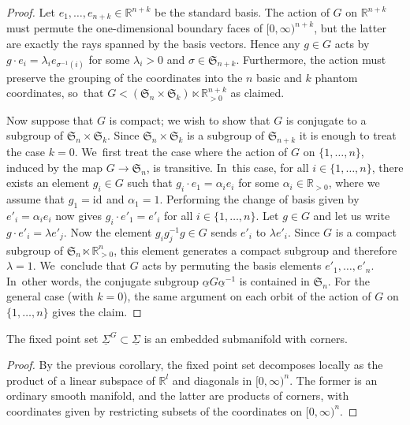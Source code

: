 \documentclass[10pt]{amsart}
\theoremstyle{definition}
\theoremstyle{remark}
\newcommand{\RR}{\mathbb{R}}
\newcommand{\halfspc}[1]{[0,\infty)^{#1}}
\newcommand{\id}[1]{\mathrm{id}_{#1}}
\newcommand{\uSig}{\underline{\Sigma}}
\newcommand{\symgp}[1]{\mathfrak{S}_{#1}}
\begin{document}
\begin{proof}
Let $e_1,\ldots,e_{n+k} \in \RR^{n+k}$ be the standard basis.
The action of $G$ on $\RR^{n+k}$ must permute the one-dimensional boundary faces of $\halfspc{n+k}$, but the latter are exactly the rays spanned by the basis vectors. Hence any $g \in G$ acts by $g \cdot e_i = \lambda_i e_{\sigma^{-1}(i)}$ for some $\lambda_i > 0$ and $\sigma \in \symgp{n+k}$.
Furthermore, the action must preserve the grouping of the coordinates into the $n$ basic and $k$ phantom coordinates, so~that $G < (\symgp{n}\times\symgp{k})\ltimes \RR_{>0}^{n+k}$ as claimed.

Now suppose that $G$ is compact; we wish to show that $G$ is conjugate to a subgroup of $\symgp{n}\times\symgp{k}$. Since $\symgp{n}\times\symgp{k}$ is a subgroup of $\symgp{n+k}$ it is enough to treat the case $k=0$. We~first treat the case where the action of $G$ on $\{1,\ldots,n\}$, induced by the map $G\to \symgp{n}$, is transitive. In~this case, for all $i\in\{1,\ldots,n\}$, there exists an element $g_i\in G$ such that $g_i \cdot e_1=\alpha_ie_i$ for some $\alpha_i\in \RR_{>0}$, where we assume that $g_1=\id{}$ and $\alpha_1=1$. Performing the change of basis given by $e'_i=\alpha_i e_i$ now gives $g_i\cdot e'_1=e'_i$ for all $i\in\{1,\ldots,n\}$. Let $g\in G$ and let us write $g\cdot e'_i=\lambda e'_j$. Now the element $g_ig_j^{-1}g\in G$ sends $e'_i$ to $\lambda e'_i$. Since $G$ is a compact subgroup of $\symgp{n}\ltimes \RR^n_{>0}$, this element generates a compact subgroup and therefore $\lambda=1$. We~conclude that $G$ acts by permuting the basis elements $e'_1,\ldots,e'_n$. In~other words, the conjugate subgroup $\underline{\alpha} G\underline{\alpha}^{-1}$ is contained in $\symgp{n}$. For the general case (with $k=0$), the same argument on each orbit of the action of $G$ on $\{1,\ldots,n\}$ gives the claim.
\end{proof}

\begin{corollary}
The fixed point set $\uSig^G \subset \uSig$ is an embedded submanifold with corners.
\end{corollary}

\begin{proof}
By the previous corollary, the fixed point set decomposes locally as the product of a linear subspace of $\RR^l$ and diagonals in $\halfspc{n}$. The former is an ordinary smooth manifold, and the latter are products of corners, with coordinates given by restricting subsets of the coordinates on $[0,\infty)^n$.
\end{proof}
\end{document}
